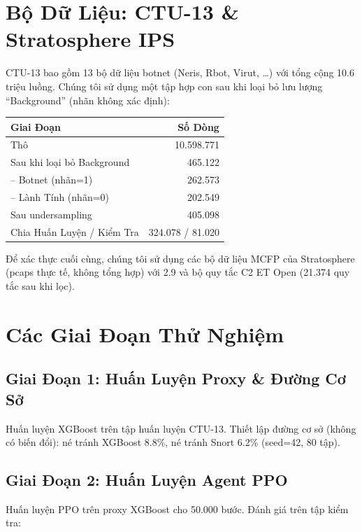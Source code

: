 \documentclass[12pt,a4paper]{report}
\begin{document}
\section{Bộ Dữ Liệu: CTU-13 \& Stratosphere IPS}

CTU-13 \cite{stratosphere_ctu13} bao gồm 13 bộ dữ liệu botnet (Neris, Rbot, Virut, \ldots) với tổng cộng 10.6 triệu luồng. Chúng tôi sử dụng một tập hợp con sau khi loại bỏ lưu lượng ``Background'' (nhãn không xác định):

\begin{table}[h]
\centering
\begin{tabular}{l|r}
Giai Đoạn & Số Dòng \\
\hline
Thô & 10.598.771 \\
Sau khi loại bỏ Background & 465.122 \\
  – Botnet (nhãn=1) & 262.573 \\
  – Lành Tính (nhãn=0) & 202.549 \\
Sau undersampling & 405.098 \\
Chia Huấn Luyện / Kiểm Tra & 324.078 / 81.020 \\
\end{tabular}
\end{table}

Để xác thực cuối cùng, chúng tôi sử dụng các bộ dữ liệu MCFP của Stratosphere \cite{ctu_datasets} (pcaps thực tế, không tổng hợp) với \Snort{} 2.9 \cite{snort_project} và bộ quy tắc C2 ET Open \cite{emerging_threats} (21.374 quy tắc sau khi lọc).

\section{Các Giai Đoạn Thử Nghiệm}

\subsection{Giai Đoạn 1: Huấn Luyện Proxy \& Đường Cơ Sở}

Huấn luyện XGBoost trên tập huấn luyện CTU-13. Thiết lập đường cơ sở (không có biến đổi): né tránh XGBoost 8.8\%, né tránh Snort 6.2\% (seed=42, 80 tập).

\subsection{Giai Đoạn 2: Huấn Luyện Agent PPO}

Huấn luyện PPO trên proxy XGBoost cho 50.000 bước. Đánh giá trên tập kiểm tra:
\end{document}
